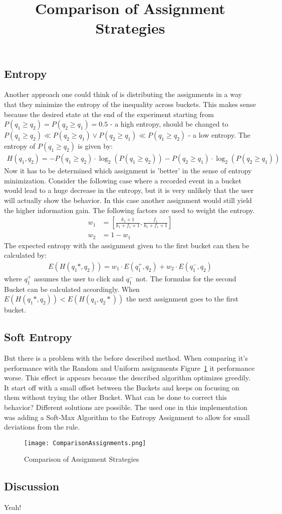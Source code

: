 \documentclass[../Thesis.tex]{subfiles}
\begin{document}
\subsection{Entropy}
Another approach one could think of is distributing the assignments in a way that they minimize the entropy of the inequality across buckets. This makes sense because the desired state at the end of the experiment starting from $P(q_1\geq q_2)=P(q_2\geq q_1)=0.5$ - a high entropy, should be changed to $P(q_1\geq q_2)\ll P(q_2\geq q_1) \lor P(q_2\geq q_1)\ll P(q_1\geq q_2)$ - a low entropy. The entropy of $P(q_1\geq q_2)$ is given by:
\begin{align*}
H(q_1,q_2) 	= - P(q_1\geq q_2) \cdot \log_2(P(q_1\geq q_2)) - P(q_2\geq q_1) \cdot \log_2(P(q_2\geq q_1))
\end{align*}
Now it has to be determined which assignment is 'better' in the sense of entropy minimization. Consider the following case where a recorded event in a bucket would lead to a huge decrease in the entropy, but it is very unlikely that the user will actually show the behavior. In this case another assignment would still yield the higher information gain. The following factors are used to weight the entropy.
\begin{align*}
w_1 &=[\frac{k_1+1}{k_1+f_1+1},\frac{f_1}{k_1+f_1+1}] \\
w_2 &=1 - w_1
\end{align*}
The expected entropy with the assignment given to the first bucket can then be calculated by:
\begin{align*}
E(H(q_1*,q_2)) = w_1\cdot E(q_1^+,q_2) + w_2\cdot E(q_1^-,q_2)
\end{align*}
where $q_1^+$ assumes the user to click and $q_1^-$ not. The formulas for the second Bucket can be calculated accordingly. When $E(H(q_1*,q_2)) < E(H(q_1,q_2*))$ the next assignment goes to the first bucket.

\subsection{Soft Entropy}
But there is a problem with the before described method. When comparing it's performance with the Random and Uniform assignments Figure~\ref{fig:AssignmentComp} it performance worse. This effect is appears because the described algorithm optimizes greedily. It start off with a small offset between the Buckets and keeps on focusing on them without trying the other Bucket. What can be done to correct this behavior? Different solutions are possible. The used one in this implementation was adding a Soft-Max Algorithm to the Entropy Assignment to allow for small deviations from the rule.
\begin{figure}[ht]
\texttt{[image: ComparisonAssignments.png]}
\centering
\title{Comparison of Assignment Strategies}
\caption{Comparison of Assignment Strategies}
\label{fig:AssignmentComp}
\end{figure}
\subsection{Discussion}
Yeah!
\end{document}
